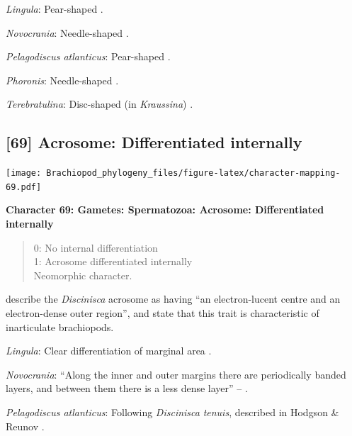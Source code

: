 \documentclass[openany]{book}
\theoremstyle{definition}
\theoremstyle{definition}
\theoremstyle{definition}
\theoremstyle{remark}
\begin{document}
\hypertarget{Lingula-coding-68}{}
\emph{Lingula}: Pear-shaped \citep{Fukumoto2003Theacrosome}.

\hypertarget{Novocrania-coding-68}{}
\emph{Novocrania}: Needle-shaped \citep{Afzelius1978Finestructure}.

\hypertarget{Pelagodiscus_atlanticus-coding-68}{}
\emph{Pelagodiscus atlanticus}: Pear-shaped
\citep{Hodgson1994Ultrastructureof}.

\hypertarget{Phoronis-coding-68}{}
\emph{Phoronis}: Needle-shaped \citep{Reunov2004Ultrastructuralstudy}.

\hypertarget{Terebratulina-coding-68}{}
\emph{Terebratulina}: Disc-shaped (in \emph{Kraussina})
\citep{Hodgson1994Ultrastructureof}.

\subsection*{{[}69{]} Acrosome: Differentiated
internally}\label{acrosome-differentiated-internally}

\texttt{[image: Brachiopod\_phylogeny\_files/figure-latex/character-mapping-69.pdf]}

\textbf{Character 69: Gametes: Spermatozoa: Acrosome: Differentiated
internally}

\begin{quote}
0: No internal differentiation\\
1: Acrosome differentiated internally\\
Neomorphic character.
\end{quote}

\citet{Hodgson1994Ultrastructureof} describe the \emph{Discinisca}
acrosome as having ``an electron-lucent centre and an electron-dense
outer region'', and state that this trait is characteristic of
inarticulate brachiopods.

\hypertarget{Lingula-coding-69}{}
\emph{Lingula}: Clear differentiation of marginal area
\citep{Fukumoto2003Theacrosome}.

\hypertarget{Novocrania-coding-69}{}
\emph{Novocrania}: ``Along the inner and outer margins there are
periodically banded layers, and between them there is a less dense
layer'' -- \citet{Afzelius1978Finestructure}.

\hypertarget{Pelagodiscus_atlanticus-coding-69}{}
\emph{Pelagodiscus atlanticus}: Following \emph{Discinisca}
\emph{tenuis}, described in Hodgson \& Reunov
\citeyearpar{Hodgson1994Ultrastructureof}.
\end{document}
